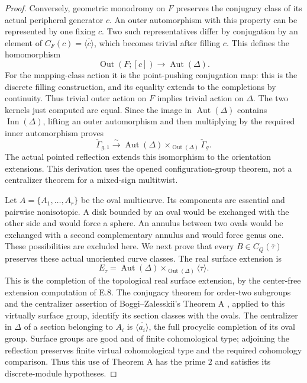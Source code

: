 \begin{proof}
Conversely, geometric monodromy on $F$ preserves the conjugacy
class of its actual peripheral generator $c$.  An outer
automorphism with this property can be represented by one fixing
$c$.  Two such representatives differ by conjugation by an
element of $C_F(c)=\overline{\langle c\rangle}$, which becomes
trivial after filling $c$.  This defines the homomorphism
\[
 \operatorname{Out}(F;[c])\longrightarrow\operatorname{Aut}(\Delta).
\]
For the mapping-class action it is the point-pushing
conjugation map: this is the discrete filling construction, and
its equality extends to the completions by continuity.  Thus
trivial outer action on $F$ implies trivial action on $\Delta$.
The two kernels just computed are equal.  Since the image in
$\operatorname{Aut}(\Delta)$ contains
$\operatorname{Inn}(\Delta)$, lifting an outer automorphism
and then multiplying by the required inner automorphism proves
\[
 \check\Gamma_{g,1}\xrightarrow{\sim}
 \operatorname{Aut}(\Delta)
       \mathbin{\times}_{\operatorname{Out}(\Delta)}
                         \check\Gamma_g.                       \tag{E.43}
\]
The actual pointed reflection extends this isomorphism to the
orientation extensions.  This derivation uses the opened
configuration-group theorem, not a centralizer theorem for a
mixed-sign multitwist.

Let $A=\{A_1,\ldots,A_r\}$ be the oval multicurve.  Its
components are essential and pairwise nonisotopic.  A disk
bounded by an oval would be exchanged with the other side and
would force a sphere.  An annulus between two ovals would be
exchanged with a second complementary annulus and would force
genus one.  These possibilities are excluded here.
We next prove that every $B\in C_Q(\bar\tau)$ preserves these
actual unoriented curve classes.  The real surface extension is
\[
 E_\tau=\operatorname{Aut}(\Delta)
       \mathbin{\times}_{\operatorname{Out}(\Delta)}
                         \langle\bar\tau\rangle.
\]
This is the completion of the topological real surface
extension, by the center-free extension computation of E.8.
The conjugacy theorem for order-two subgroups and the
centralizer assertion of Boggi--Zalesskii's Theorem A
\cite{ET_BZ2024}, applied to this virtually surface group,
identify its section classes with the ovals.  The centralizer
in $\Delta$ of a section belonging to $A_i$ is
$\overline{\langle a_i\rangle}$, the full procyclic completion
of its oval group.  Surface groups are good and of finite
cohomological type; adjoining the reflection preserves
finite virtual cohomological type and the required cohomology
comparison.  Thus this use of Theorem A has the prime $2$ and
satisfies its discrete-module hypotheses.


\end{proof}
